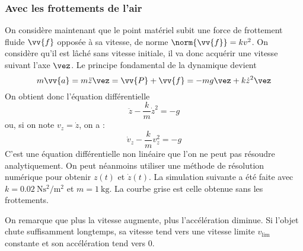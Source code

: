 \documentclass{cours}
\begin{document}
\subsubsection{Avec les frottements de l'air}%
\label{ssub:avec_les_frottements_de_l_air}
On considère maintenant que le point matériel subit une force de frottement fluide $\vv{f}$ opposée à sa vitesse, de norme  $\norm{\vv{f}} = k v^2$. On considère qu'il est lâché sans vitesse initiale, il va donc acquérir une vitesse suivant l'axe $\vez$. Le principe fondamental de la dynamique devient 
\begin{equation}
m \vv{a} = m \ddot{z}\vez  = \vv{P} + \vv{f} = -mg\vez + k \dot{z}^2 \vez
\end{equation}
On obtient donc l'équation différentielle 
\begin{equation}
\ddot{z} - \frac{k}{m}\dot{z}^2 = -g
\end{equation}
ou, si on note $v_z = \dot{z}$, on a :
\begin{equation}
\dot{v}_z - \frac{k}{m} v_z^2 = -g
\label{eq:diffv}
\end{equation}
C'est une équation différentielle non linéaire que l'on ne peut pas résoudre analytiquement. On peut néanmoins utiliser une méthode de résolution numérique pour obtenir $z(t)$ et $\dot{z}(t)$. La simulation suivante a été faite avec $k=\SI{0.02}{\newton\second\squared\per\meter\squared}$ et $m=\SI{1}{\kilo\gram}$. La courbe grise est celle obtenue sans les frottements. 
\begin{center}
  \hspace{1em}
\end{center}
On remarque que plus la vitesse augmente, plus l'accélération diminue. Si l'objet chute suffisamment longtemps, sa vitesse tend vers une vitesse limite $v_\text{lim}$ constante et son accélération tend vers 0.
\end{document}
